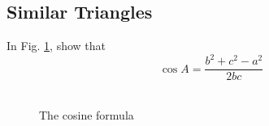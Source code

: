 \subsection{Similar Triangles}
\begin{problem}
In Fig. \ref{ch2_cosine_formula}, show that
%
\begin{equation}
\cos A = \frac{b^2+c^2-a^2}{2bc}
\end{equation}
%
\
\end{problem}
\begin{figure}[!h]
	\begin{center}
		
		\resizebox{\columnwidth}{!}{}
	\end{center}
	\caption{The cosine formula}
	\label{ch2_cosine_formula}	
\end{figure}

